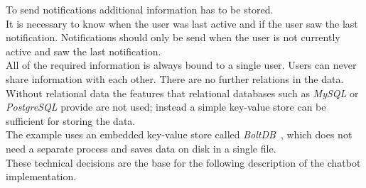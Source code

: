 To send notifications additional information has to be stored.
\\
It is necessary to know when the user was last active and if the user saw the last notification.
Notifications should only be send when the user is not currently active and saw the last notification.
\\

All of the required information is always bound to a single user.
Users can never share information with each other.
There are no further relations in the data.
\\
Without relational data the features that relational databases such as \emph{MySQL} or \emph{PostgreSQL} provide are not used;
instead a simple key-value store can be sufficient for storing the data.
\\
The example uses an embedded key-value store called \emph{BoltDB}~\cite{boltdb}, which does not need a separate process and saves data on disk in a single file.
\\


These technical decisions are the base for the following description of the chatbot implementation.
